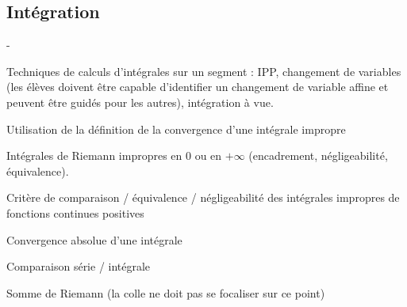\documentclass[11pt]{article}%
\begin{document}
\subsection*{Intégration}

\begin{noliste}{-}
 \item Techniques de calculs d'intégrales sur un segment : IPP, 
 changement de variables (les élèves doivent être capable d'identifier 
 un changement de variable affine et peuvent être guidés pour les 
 autres), intégration à vue.
 \item Utilisation de la définition de la convergence d'une intégrale 
 impropre
 \item Intégrales de Riemann impropres en $0$ ou en $+\infty$ 
 (encadrement, négligeabilité, équivalence).
 \item Critère de comparaison / équivalence / négligeabilité des 
 intégrales impropres de fonctions continues positives
 \item Convergence absolue d'une intégrale
 \item Comparaison série / intégrale
 \item Somme de Riemann (la colle ne doit pas se focaliser sur ce point)
\end{noliste}
\end{document}
